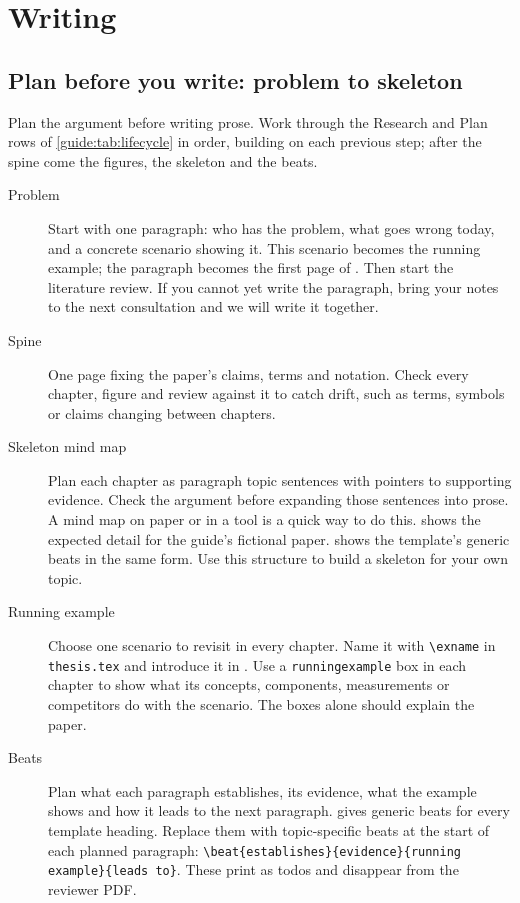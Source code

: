 \chapter{Writing}\label{guide:writing}
\section{Plan before you write: problem to skeleton}\label{guide:writing:spine}
Plan the argument before writing prose. Work through the Research and Plan rows of \cref{guide:tab:lifecycle} in order, building on each previous step; after the spine come the figures, the skeleton and the beats.
\begin{description}
  \item[Problem] Start with one paragraph: who has the problem, what goes wrong today, and a concrete scenario showing it. This scenario becomes the running example; the paragraph becomes the first page of . Then start the literature review. If you cannot yet write the paragraph, bring your notes to the next consultation and we will write it together.
  \item[Spine] One page fixing the paper's claims, terms and notation. Check every chapter, figure and review against it to catch drift, such as terms, symbols or claims changing between chapters.
  \item[Skeleton mind map] Plan each chapter as paragraph topic sentences with pointers to supporting evidence. Check the argument before expanding those sentences into prose. A mind map on paper or in a tool is a quick way to do this.  shows the expected detail for the guide's fictional paper.  shows the template's generic beats in the same form. Use this structure to build a skeleton for your own topic.
  \item[Running example] Choose one scenario to revisit in every chapter. Name it with \texttt{\textbackslash exname} in \texttt{thesis.tex} and introduce it in . Use a \texttt{runningexample} box in each chapter to show what its concepts, components, measurements or competitors do with the scenario. The boxes alone should explain the paper.
  \item[Beats] Plan what each paragraph establishes, its evidence, what the example shows and how it leads to the next paragraph.  gives generic beats for every template heading. Replace them with topic-specific beats at the start of each planned paragraph: \texttt{\textbackslash beat\{establishes\}\{evidence\}\{running example\}\{leads to\}}. These print as todos and disappear from the reviewer PDF.
\end{description}

